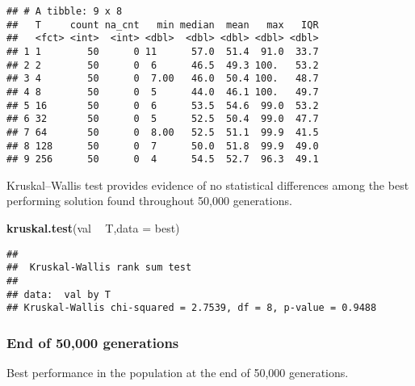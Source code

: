 \documentclass[]{book}
\newenvironment{Shaded}{\begin{snugshade}}{\end{snugshade}}
\newcommand{\DataTypeTok}[1]{\textcolor[rgb]{0.13,0.29,0.53}{#1}}
\newcommand{\KeywordTok}[1]{\textcolor[rgb]{0.13,0.29,0.53}{\textbf{#1}}}
\newcommand{\NormalTok}[1]{#1}
\newcommand{\OperatorTok}[1]{\textcolor[rgb]{0.81,0.36,0.00}{\textbf{#1}}}
\newcommand{\StringTok}[1]{\textcolor[rgb]{0.31,0.60,0.02}{#1}}
\begin{document}
\begin{verbatim}
## # A tibble: 9 x 8
##   T     count na_cnt   min median  mean   max   IQR
##   <fct> <int>  <int> <dbl>  <dbl> <dbl> <dbl> <dbl>
## 1 1        50      0 11      57.0  51.4  91.0  33.7
## 2 2        50      0  6      46.5  49.3 100.   53.2
## 3 4        50      0  7.00   46.0  50.4 100.   48.7
## 4 8        50      0  5      44.0  46.1 100.   49.7
## 5 16       50      0  6      53.5  54.6  99.0  53.2
## 6 32       50      0  5      52.5  50.4  99.0  47.7
## 7 64       50      0  8.00   52.5  51.1  99.9  41.5
## 8 128      50      0  7      50.0  51.8  99.9  49.0
## 9 256      50      0  4      54.5  52.7  96.3  49.1
\end{verbatim}

Kruskal--Wallis test provides evidence of no statistical differences among the best performing solution found throughout 50,000 generations.

\begin{Shaded}
\begin{Highlighting}[]
\KeywordTok{kruskal.test}\NormalTok{(val }\OperatorTok{~}\StringTok{ }\NormalTok{T,}\DataTypeTok{data =}\NormalTok{ best)}
\end{Highlighting}
\end{Shaded}

\begin{verbatim}
## 
##  Kruskal-Wallis rank sum test
## 
## data:  val by T
## Kruskal-Wallis chi-squared = 2.7539, df = 8, p-value = 0.9488
\end{verbatim}

\hypertarget{end-of-50000-generations-10}{%
\subsubsection{End of 50,000 generations}\label{end-of-50000-generations-10}}

Best performance in the population at the end of 50,000 generations.
\end{document}
